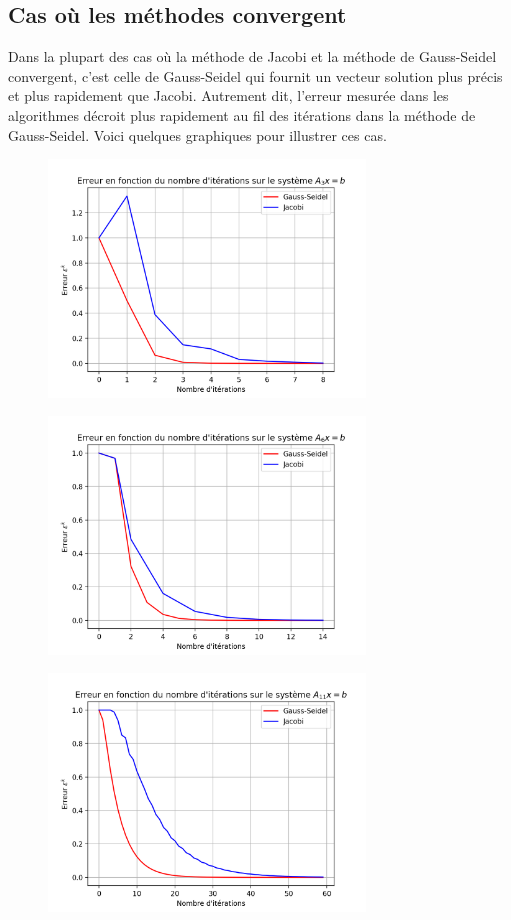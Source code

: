 \subsection{Cas où les méthodes convergent}
Dans la plupart des cas où la méthode de Jacobi et la méthode de Gauss-Seidel convergent, c'est celle de Gauss-Seidel qui fournit un vecteur solution plus précis et plus rapidement que Jacobi. Autrement dit, l'erreur mesurée dans les algorithmes décroit plus rapidement au fil des itérations dans la méthode de Gauss-Seidel.
Voici quelques graphiques pour illustrer ces cas.
\begin{figure}[H]
    \centering
    \includegraphics[width=0.75\textwidth]{graphes/graphs/resA3.png}
\end{figure}
\begin{figure}[H]
    \centering
    \includegraphics[width=0.75\textwidth]{graphes/graphs/resA6.png}
\end{figure}
\begin{figure}[H]
    \centering
    \includegraphics[width=0.75\textwidth]{graphes/graphs/resA11.png}
\end{figure}

